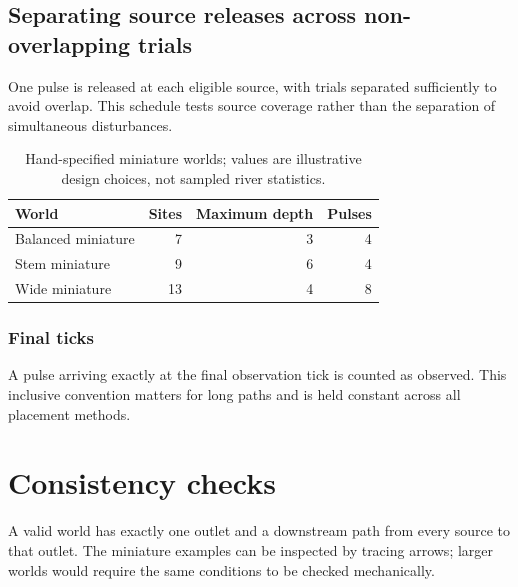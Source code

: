\subsection{Separating source releases across non-overlapping trials}\label{demo-worlds-pulses}
One pulse is released at each eligible source, with trials separated sufficiently to avoid overlap. This schedule tests source coverage rather than the separation of simultaneous disturbances.
\begin{table}[htbp]
\centering
\begin{tabular}{lrrr}
\hline
World & Sites & Maximum depth & Pulses \\
\hline
Balanced miniature & 7 & 3 & 4 \\
Stem miniature & 9 & 6 & 4 \\
Wide miniature & 13 & 4 & 8 \\
\hline
\end{tabular}
\caption{Hand-specified miniature worlds; values are illustrative design choices, not sampled river statistics.}\label{demo-tab-worlds}
\end{table}
\subsubsection{Final ticks}\label{demo-worlds-boundary}
A pulse arriving exactly at the final observation tick is counted as observed. This inclusive convention matters for long paths and is held constant across all placement methods.
\section{Consistency checks}\label{demo-worlds-checks}
A valid world has exactly one outlet and a downstream path from every source to that outlet. The miniature examples can be inspected by tracing arrows; larger worlds would require the same conditions to be checked mechanically.
